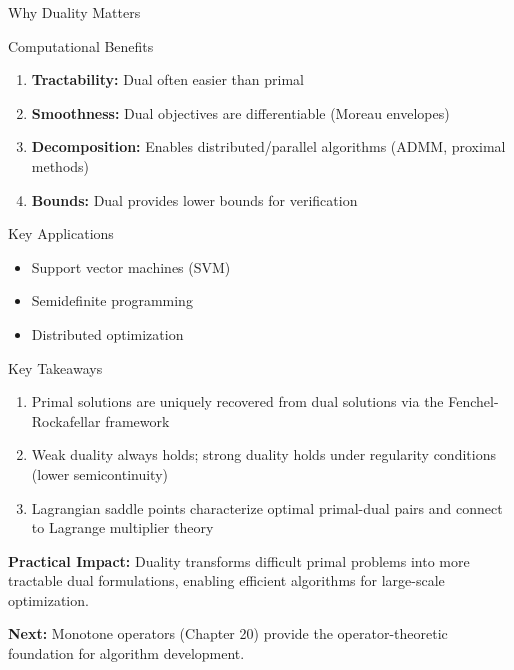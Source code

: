 \documentclass[aspectratio=169,10pt]{beamer}
\begin{document}
\begin{frame}{Why Duality Matters}
    \begin{block}{Computational Benefits}
        \begin{enumerate}
            \item \textbf{Tractability:} Dual often easier than primal
            \item \textbf{Smoothness:} Dual objectives are differentiable (Moreau envelopes)
            \item \textbf{Decomposition:} Enables distributed/parallel algorithms (ADMM, proximal methods)
            \item \textbf{Bounds:} Dual provides lower bounds for verification
        \end{enumerate}
    \end{block}

    \vspace{10pt}

    \begin{block}{Key Applications}
        \begin{itemize}
            \item Support vector machines (SVM)
            \item Semidefinite programming
            \item Distributed optimization
        \end{itemize}
    \end{block}
\end{frame}

\begin{frame}{Key Takeaways}
    \begin{enumerate}
        \item[\textbf{19.1}] Primal solutions are uniquely recovered from dual solutions via the Fenchel-Rockafellar framework

        \item[\textbf{19.2}] Weak duality always holds; strong duality holds under regularity conditions (lower semicontinuity)

        \item[\textbf{19.3}] Lagrangian saddle points characterize optimal primal-dual pairs and connect to Lagrange multiplier theory
    \end{enumerate}

    \vspace{15pt}

    \textbf{Practical Impact:} Duality transforms difficult primal problems into more tractable dual formulations,
    enabling efficient algorithms for large-scale optimization.

    \vspace{10pt}

    \textbf{Next:} Monotone operators (Chapter 20) provide the operator-theoretic foundation for algorithm development.
\end{frame}
\end{document}
